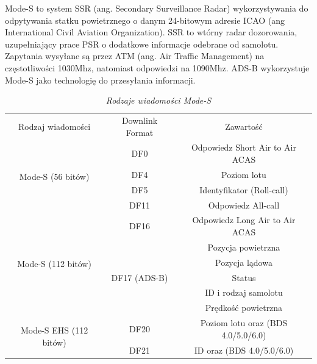 \documentclass[eng,printmode]{mgr}
\begin{document}
Mode-S to system SSR (ang. Secondary Surveillance Radar) wykorzystywania do odpytywania statku powietrznego o danym 24-bitowym adresie ICAO (ang International Civil Aviation Organization). SSR to wtórny radar dozorowania, uzupełniający prace PSR o dodatkowe informacje odebrane od samolotu. Zapytania wysyłane są przez ATM (ang. Air Traffic Management) na częstotliwości 1030Mhz, natomiast odpowiedzi na 1090Mhz. ADS-B wykorzystuje Mode-S jako technologię do przesyłania informacji.
\begin{table}[ph]
\caption{\textit{ Rodzaje wiadomości Mode-S}}
\label{tab:adsb}
  \centering
  \def\arraystretch{1.3}%
  \begin{tabular}{|c|c|c|}
  \hline
  \multicolumn{1}{|c|}{Rodzaj wiadomości} & \multicolumn{1}{c|}{Downlink Format} & \multicolumn{1}{c|}{Zawartość} \\\cline{1-3}
  \multirow{4}{*}{Mode-S (56 bitów)} 
  				 & \multicolumn{1}{c|}{DF0} & \multicolumn{1}{c|}{Odpowiedz Short Air to Air ACAS} \\\cline{2-3}
                 & \multicolumn{1}{c|}{DF4} & \multicolumn{1}{c|}{Poziom lotu} \\\cline{2-3}
                 & \multicolumn{1}{c|}{DF5} & \multicolumn{1}{c|}{Identyfikator (Roll-call)} \\\cline{2-3}
                 & \multicolumn{1}{c|}{DF11} & \multicolumn{1}{c|}{Odpowiedz All-call} \\\hline
  \multirow{6}{*}{Mode-S (112 bitów)} 
  				 & \multicolumn{1}{c|}{DF16} & \multicolumn{1}{c|}{Odpowiedz Long Air to Air ACAS} \\\cline{2-3}
                 & \multirow{5}{*}{DF17 (ADS-B)} & Pozycja powietrzna \\\hhline{~~~} 
                 &                       & Pozycja lądowa \\\hhline{~~~} 
                 &                       & Status \\\hhline{~~~} 
                 &                       & ID i rodzaj samolotu  \\\hhline{~~~} 
                 &                       & Prędkość powietrzna \\\hline
 \multirow{2}{*}{Mode-S EHS (112 bitów)} 
	& \multicolumn{1}{c|}{DF20} & \multicolumn{1}{c|}{Poziom lotu oraz (BDS 4.0/5.0/6.0)} \\\cline{2-3}
	& \multicolumn{1}{c|}{DF21} & \multicolumn{1}{c|}{ID oraz (BDS 4.0/5.0/6.0)} \\\hline
 \end{tabular}
\end{table}
\newpage
\end{document}
